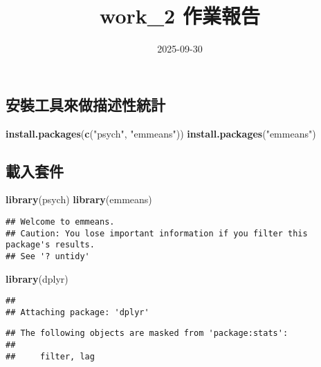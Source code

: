 \documentclass[
  12pt,
]{article}
\title{work\_2 作業報告}
\author{}
\date{\vspace{-2.5em}2025-09-30}
\newenvironment{Shaded}{\begin{snugshade}}{\end{snugshade}}
\newcommand{\FunctionTok}[1]{\textcolor[rgb]{0.13,0.29,0.53}{\textbf{#1}}}
\newcommand{\NormalTok}[1]{#1}
\newcommand{\StringTok}[1]{\textcolor[rgb]{0.31,0.60,0.02}{#1}}
\begin{document}
\maketitle

{
\setcounter{tocdepth}{2}
\tableofcontents
}
\subsection{安裝工具來做描述性統計}\label{ux5b89ux88ddux5de5ux5177ux4f86ux505aux63cfux8ff0ux6027ux7d71ux8a08}

\begin{Shaded}
\begin{Highlighting}[]
\FunctionTok{install.packages}\NormalTok{(}\FunctionTok{c}\NormalTok{(}\StringTok{"psych"}\NormalTok{, }\StringTok{"emmeans"}\NormalTok{))}
\FunctionTok{install.packages}\NormalTok{(}\StringTok{"emmeans"}\NormalTok{)}
\end{Highlighting}
\end{Shaded}

\subsection{載入套件}\label{ux8f09ux5165ux5957ux4ef6}

\begin{Shaded}
\begin{Highlighting}[]
\FunctionTok{library}\NormalTok{(psych)}
\FunctionTok{library}\NormalTok{(emmeans)}
\end{Highlighting}
\end{Shaded}

\begin{verbatim}
## Welcome to emmeans.
## Caution: You lose important information if you filter this package's results.
## See '? untidy'
\end{verbatim}

\begin{Shaded}
\begin{Highlighting}[]
\FunctionTok{library}\NormalTok{(dplyr)}
\end{Highlighting}
\end{Shaded}

\begin{verbatim}
## 
## Attaching package: 'dplyr'
\end{verbatim}

\begin{verbatim}
## The following objects are masked from 'package:stats':
## 
##     filter, lag
\end{verbatim}
\end{document}
